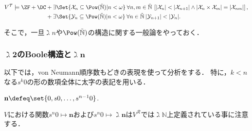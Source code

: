 \documentclass[realisability.tex]{subfiles}
\begin{document}
\begin{theorem}[Krivine]\label{thm:patho-sets-of-reals}
 \[
  V^{\mathcal{T}}
   \models \ZF + \DC
    \begin{aligned}[t]
     &+\exists \Set{ \mathcal{X}_n \subseteq \Pow(\NN) | n < \omega } \:
     \forall n, m \in \NN \:
    \left[|\mathcal{X}_{n}| < |\mathcal{X}_{n+1}| \land |\mathcal{X}_n \times \mathcal{X}_m| = |\mathcal{X}_{nm}|\right],\\
     &+ \exists \Set{ \mathcal{Y}_n \subseteq \Pow(\NN) | n <\omega} \: \forall n \in\NN \:
       |\mathcal{Y}_{n+1}| < |\mathcal{Y}_n|.
    \end{aligned}
 \]
\end{theorem}

そこで，一旦$\gimel n$や$\Pow(\NN)$の構造に関する一般論をやっておく．

\subsubsection{$\gimel \mathbf{2}$のBoole構造と$\gimel \mathbf{n}$}
以下では，von Neumann順序数もどきの表現を使って分析をする．
特に，$k < n$なる$s^k 0$の形の数項全体に太字の表記を用いる．
\begin{notation}
 $\mathbf{n} \defeq \set{0, s0, \dots, s^{n-1} 0}$.

 $V$における関数$s^n 0 \mapsto \mathbf{n}$および$s^n 0 \mapsto \gimel \mathbf{n}$は$V^{\mathcal{R}}$では$\gimel \mathbb{N}$上定義されている事に注意する．
\end{notation}
\end{document}
